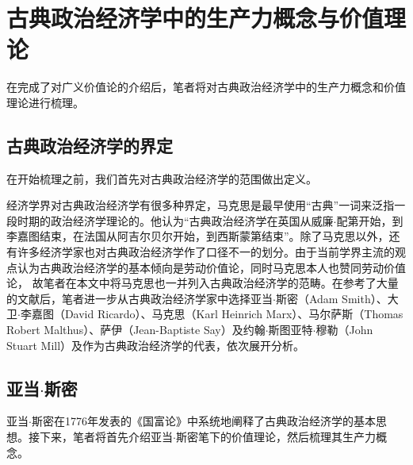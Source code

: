 
\chapter{古典政治经济学中的生产力概念与价值理论}

在完成了对广义价值论的介绍后，笔者将对古典政治经济学中的生产力概念和价值理论进行梳理。

\section{古典政治经济学的界定}

在开始梳理之前，我们首先对古典政治经济学的范围做出定义。

经济学界对古典政治经济学有很多种界定，马克思是最早使用“古典”一词来泛指一段时期的政治经济学理论的\cite[7]{YueHan*MeiNaDe*KaiEnSiJiuYeLiXiHeHuoBiTongLunChongYiBen2021}。他认为“古典政治经济学在英国从威廉$\cdot$配第开始，到李嘉图结束，在法国从阿吉尔贝尔开始，到西斯蒙第结束”\cite[56]{QiaEr*MaKeSiZhengZhiJingJiXuePiPanYingWenBan2022}。除了马克思以外，还有许多经济学家也对古典政治经济学作了口径不一的划分\cite[5-8]{CaiJiMingCongGuDianZhengZhiJingJiXueDaoZhongGuoTeSeSheHuiZhuYiZhengZhiJingJiXueJiYuZhongGuoShiJiaoDeZhengZhiJingJiXueYanBianShangCe2023}。由于当前学界主流的观点\cite[56]{QiaEr*MaKeSiZhengZhiJingJiXuePiPanYingWenBan2022}\cite[45]{ChenDaiSunCongGuDianJingJiXuePaiDaoMaKeSiRuoGanZhuYaoXueShuoFaZhanLueLun2014}\cite[12]{CaiJiMingCongGuDianZhengZhiJingJiXueDaoZhongGuoTeSeSheHuiZhuYiZhengZhiJingJiXueJiYuZhongGuoShiJiaoDeZhengZhiJingJiXueYanBianShangCe2023}认为古典政治经济学的基本倾向是劳动价值论，同时马克思本人也赞同劳动价值论，
故笔者在本文中将马克思也一并列入古典政治经济学的范畴。在参考了大量的文献后，笔者进一步从古典政治经济学家中选择亚当$\cdot$斯密（Adam  Smith）、大卫$\cdot$李嘉图（David Ricardo）、马克思（Karl Heinrich Marx）、马尔萨斯（Thomas Robert Malthus）、萨伊（Jean-Baptiste Say）及约翰$\cdot$斯图亚特$\cdot$穆勒（John Stuart Mill）及作为古典政治经济学的代表，依次展开分析。

\section{亚当$\cdot$斯密}
 
亚当$\cdot$斯密在1776年发表的《国富论》中系统地阐释了古典政治经济学的基本思想\cite[120]{CaiJiMingCongGuDianZhengZhiJingJiXueDaoZhongGuoTeSeSheHuiZhuYiZhengZhiJingJiXueJiYuZhongGuoShiJiaoDeZhengZhiJingJiXueYanBianShangCe2023}\cite[90]{YanZhiJieXiFangJingJiXueShuoShiJiaoChengDiErBan2013}。接下来，笔者将首先介绍亚当$\cdot$斯密笔下的价值理论，然后梳理其生产力概念。

